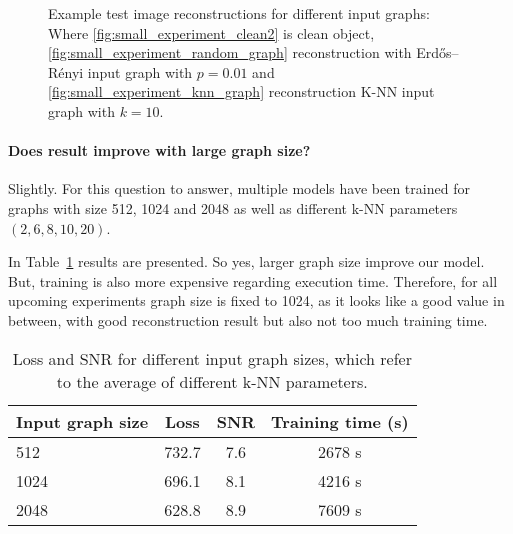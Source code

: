   \begin{figure}[H]
    \label{fig:input_graph_small}
    \hfill
    \hfill
    \hfill
    \hfill
	\caption{Example test image reconstructions for different input graphs:\\
  Where \ref{fig:small_experiment_clean2} is clean object, 
  \ref{fig:small_experiment_random_graph} reconstruction with  Erdős–Rényi input graph with $p=0.01$ and 
  \ref{fig:small_experiment_knn_graph} reconstruction K-NN input graph with $k=10$.
  }
\end{figure}


  \paragraph{Does result improve with large graph size?}
  Slightly.
  For this question to answer, multiple models have been trained for graphs with size 512, 1024 and 2048 
  as well as different k-NN parameters $(2,6,8,10,20)$.

  In Table~\ref{tab:graph_knn} results are presented. 
  So yes, larger graph size improve our model. 
  But, training is also more expensive regarding execution time. 
  Therefore, for all upcoming experiments graph size is fixed to 1024, as it looks like a good
  value in between, with good reconstruction result but also not too much training time.
  
  \begin{table}[H]
    \centering
      \begin{tabular}{l|ccc}
      \toprule
      \textbf{Input graph size} & \textbf{Loss} & \textbf{SNR} & \textbf{Training time (s)}  \\ 
      \midrule
      512  &  732.7    &  7.6  & 2678 s \\ \hline
      1024 &  696.1    &  8.1  & 4216 s \\ \hline
      2048 &  628.8    &  8.9  & 7609 s  \\ \hline
      \midrule
      \end{tabular}
    \caption{Loss and SNR for different input graph sizes, which refer to the average of different k-NN parameters.}
    \label{tab:graph_knn}
  \end{table}

